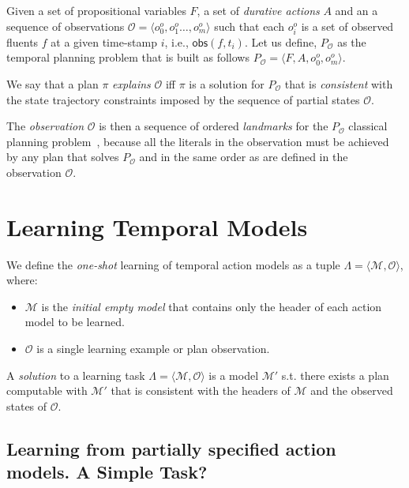 \documentclass[runningheads]{llncs}
\newcommand{\tup}[1]{{\langle #1 \rangle}}
\newcommand{\obs}{\mathsf{obs}}    %
\begin{document}
Given a set of propositional variables $F$, a set of {\em durative actions} $A$ and an a sequence of observations $\mathcal{O}=\tup{o_0^o,o_1^o \ldots , o_m^o}$ such that each $o_i^o$ is a set of observed fluents $f$ at a given time-stamp $i$, i.e., $\obs(f,t_i)$. Let us define, $P_\mathcal{O}$ as the temporal planning problem that is built as follows $P_\mathcal{O}=\tup{F,A,o_0^o,o_m^o}$. 
\begin{definition}[Explanation]
We say that a plan $\pi$ {\em explains} $\mathcal{O}$ iff $\pi$ is a solution for $P_\mathcal{O}$ that is {\em consistent} with the state trajectory constraints imposed by the sequence of partial states $\mathcal{O}$.
\end{definition}

The {\em observation} $\mathcal{O}$ is then a sequence of ordered {\em landmarks} for the $P_\mathcal{O}$ classical planning problem~\cite{hoffmann2004ordered}, because all the literals in the observation must be achieved by any plan that solves $P_\mathcal{O}$ and in the same order as are defined in the observation $\mathcal{O}$.



\section{Learning Temporal Models}
\label{sec:learning}

We define the {\em one-shot} learning of temporal action models as a tuple $\Lambda=\tup{\mathcal{M},{\mathcal O}}$, where:

\begin{itemize}
\item $\mathcal{M}$ is the {\em initial empty model} that contains only the header of each action model to be learned.
\item $\mathcal{O}$ is a single learning example or plan observation.
\end{itemize}

A {\em solution} to a learning task $\Lambda=\tup{\mathcal{M},{\mathcal O}}$ is a model $\mathcal{M}'$ s.t. there exists a plan computable with $\mathcal{M}'$ that is consistent with the headers of $\mathcal{M}$ and the observed states of $\mathcal{O}$. 



\subsection{Learning from partially specified action models. A Simple Task?}
\end{document}
